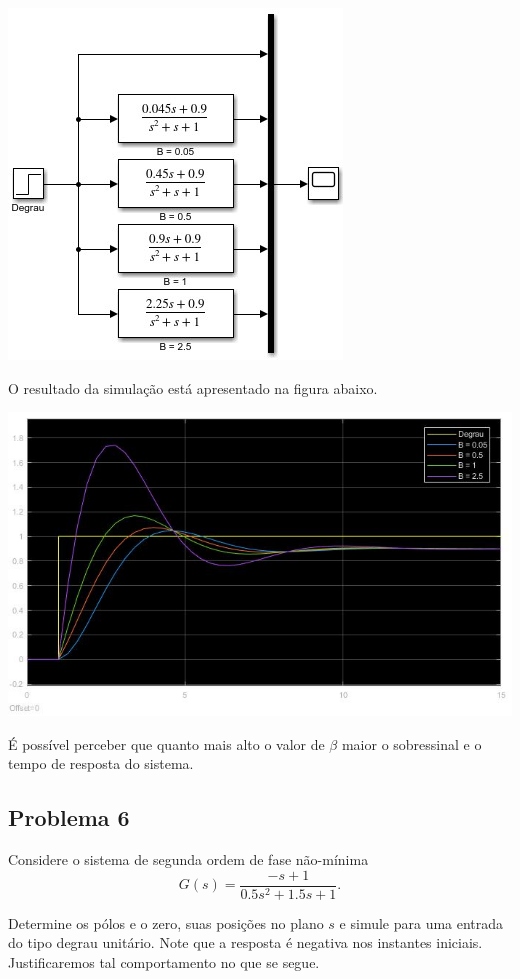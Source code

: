 \documentclass[
]{book}
\begin{document}
\includegraphics{Imagens/Lab2/modelSim5.jpg}

O resultado da simulação está apresentado na figura abaixo.

\includegraphics{Imagens/Lab2/prob5SimResult.jpg}

É possível perceber que quanto mais alto o valor de \(\beta\) maior o sobressinal e o tempo de resposta do sistema.

\hypertarget{problema-6}{%
\subsection*{Problema 6}\label{problema-6}}

Considere o sistema de segunda ordem de fase não-mínima
\[
G(s) = \frac {-s+1}{0.5s^2+1.5s+1}.
\]

Determine os pólos e o zero, suas posições no plano \(s\) e simule para uma entrada do tipo degrau unitário. Note que a resposta é negativa nos instantes iniciais. Justificaremos tal comportamento no que se segue.
\end{document}
